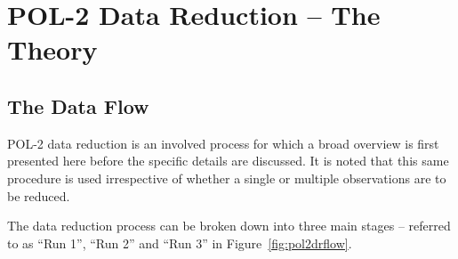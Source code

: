 \chapter{POL-2 Data Reduction -- The Theory}
\label{sec:dr}
\section{The Data Flow}

POL-2 data reduction is an involved process for which a broad overview
is first presented here before the specific details are discussed. It
is noted that this same procedure is used irrespective of whether a
single or multiple observations are to be reduced.

The data reduction process can be broken down into three main stages --
referred to as ``Run 1'', ``Run 2'' and ``Run 3'' in Figure~\ref{fig:pol2drflow}.

